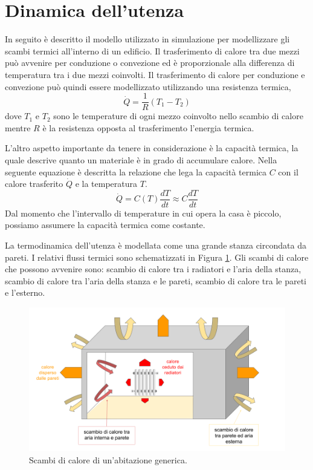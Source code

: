 \documentclass[laurea,oneside,11pt]{USiena_tesiLM}
\begin{document}
\section{Dinamica dell'utenza}
\label{sec:dinamicautenza}
In seguito è descritto il modello utilizzato in simulazione per modellizzare gli scambi termici all'interno di un edificio. 
Il trasferimento di calore tra due mezzi può avvenire per conduzione o convezione ed è proporzionale alla differenza di temperatura tra i due mezzi coinvolti. Il trasferimento di calore per conduzione e convezione può quindi essere modellizzato utilizzando una resistenza termica,
\begin{equation}
\dot{Q} = \frac{1}{R} (T_1-T_2)
\label{eq:q1}
\end{equation}
dove $T_1$ e $T_2$ sono le temperature di ogni mezzo coinvolto nello scambio di calore mentre $R$ è la resistenza opposta al trasferimento l'energia termica.

L'altro aspetto importante da tenere in considerazione è la capacità termica, la quale descrive quanto un materiale  è in grado di accumulare calore. Nella seguente equazione è descritta la relazione che lega la capacità termica $C$ con il calore trasferito $\dot{Q}$ e la temperatura $T$.
\begin{equation}
\dot{Q} = C(T) \frac{dT}{dt} \approx C \frac{dT}{dt}
\label{eq:q2}
\end{equation}
Dal momento che l'intervallo di temperature in cui opera la casa è piccolo, possiamo  assumere la capacità termica come costante.

La termodinamica dell'utenza è modellata come una grande stanza circondata da pareti. I relativi flussi termici sono schematizzati in Figura \ref{fig:scambio}. Gli scambi di calore che possono avvenire sono: scambio di calore tra i radiatori e l'aria della stanza, scambio di calore tra l'aria della stanza e le pareti, scambio di calore tra le pareti e l'esterno.

\begin{figure}[h]
\begin{center}
\includegraphics[width=1.05\textwidth]{figure/scambio_casa}
\caption{Scambi di calore di un'abitazione generica.}
\label{fig:scambio}
\end{center}
\end{figure}
\end{document}
